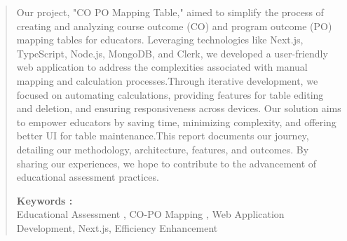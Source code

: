 \documentclass[12pt]{report}
\begin{document}
	
	\begin{quote}
		
		\hspace{1cm}Our project, "CO PO Mapping Table," aimed to simplify the process of creating and analyzing course outcome (CO) and program outcome (PO) mapping tables for educators. Leveraging technologies like Next.js, TypeScript, Node.js, MongoDB, and Clerk, we developed a user-friendly web application to address the complexities associated with manual mapping and calculation processes.Through iterative development, we focused on automating calculations, providing features for table editing and deletion, and ensuring responsiveness across devices. Our solution aims to empower educators by saving time, minimizing complexity, and offering better UI for table maintenance.This report documents our journey, detailing our methodology, architecture, features, and outcomes. By sharing our experiences, we hope to contribute to the advancement of educational assessment practices.
		
		
		
		
		\textbf{Keywords :}\\[1ex]
		Educational Assessment , CO-PO Mapping , Web Application Development, Next.js, Efficiency Enhancement
		
		
	\end{quote}
	\clearpage
	\tableofcontents
	\newpage
	
\end{document}
